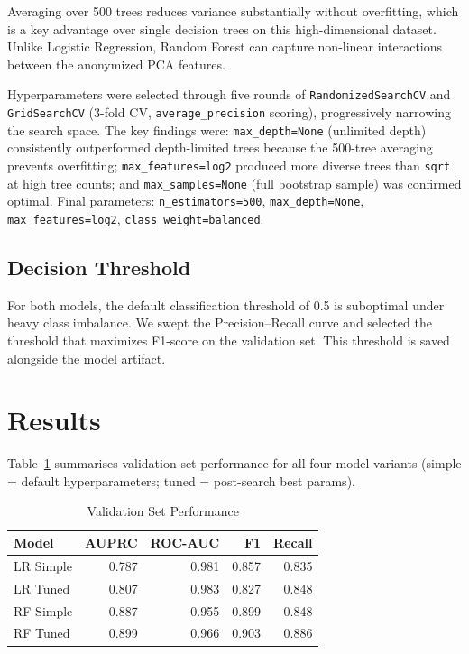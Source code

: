 \documentclass[a4, 10 pt, conference]{ieeeconf}
\begin{document}
Averaging over 500 trees reduces variance substantially without overfitting,
which is a key advantage over single decision trees on this high-dimensional
dataset. Unlike Logistic Regression, Random Forest can capture non-linear
interactions between the anonymized PCA features.

Hyperparameters were selected through five rounds of \texttt{RandomizedSearchCV}
and \texttt{GridSearchCV} (3-fold CV, \texttt{average\_precision} scoring),
progressively narrowing the search space. The key findings were:
\texttt{max\_depth=None} (unlimited depth) consistently outperformed depth-limited
trees because the 500-tree averaging prevents overfitting;
\texttt{max\_features=log2} produced more diverse trees than \texttt{sqrt} at
high tree counts;
and \texttt{max\_samples=None} (full bootstrap sample) was confirmed optimal.
Final parameters: \texttt{n\_estimators=500}, \texttt{max\_depth=None},
\texttt{max\_features=log2}, \texttt{class\_weight=balanced}.

\subsection{Decision Threshold}

For both models, the default classification threshold of 0.5 is suboptimal under
heavy class imbalance. We swept the Precision–Recall curve and selected the
threshold that maximizes F1-score on the validation set. This threshold is saved
alongside the model artifact.

\section{Results}
\label{sec:results}

Table~\ref{tab:metrics} summarises validation set performance for all four model
variants (simple = default hyperparameters; tuned = post-search best params).

\begin{table}[h]
\centering
\caption{Validation Set Performance}
\label{tab:metrics}
\begin{tabular}{lrrrr}
\toprule
Model & AUPRC & ROC-AUC & F1 & Recall \\
\midrule
LR Simple    & 0.787 & 0.981 & 0.857 & 0.835 \\
LR Tuned     & 0.807 & 0.983 & 0.827 & 0.848 \\
RF Simple    & 0.887 & 0.955 & 0.899 & 0.848 \\
RF Tuned     & 0.899 & 0.966 & 0.903 & 0.886 \\
\bottomrule
\end{tabular}
\end{table}
\end{document}
